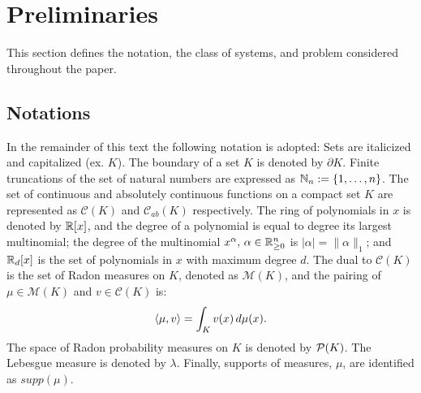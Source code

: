   \section{Preliminaries}
\label{sec:preliminaries}
  This section defines the notation, the class of systems, and problem considered throughout the paper.

  \subsection{Notations}
  In the remainder of this text the following notation is adopted:
Sets are italicized and capitalized (ex. $K$).
The boundary of a set $K$ is denoted by $\partial K$.
Finite truncations of the set of natural numbers are expressed as \mbox{$\mathbb{N}_n:=\{1,\ldots,n\}$}.
The set of continuous and absolutely continuous functions on a compact set $K$ are represented as $\mathcal C(K)$ and $\mathcal C_{ab}(K)$ respectively.
The ring of polynomials in $x$ is denoted by $\mathbb{R}[x]$, and the degree of a polynomial is equal to degree its largest multinomial; the degree of the multinomial $x^\alpha,\,\alpha\in \mathbb{R}_{\ge 0}^n$ is $|\alpha|=\|\alpha\|_1$; and $\mathbb{R}_d[x]$ is the set of polynomials in $x$ with maximum degree $d$.
The dual to $\mathcal C(K)$ is the set of Radon measures on $K$, denoted as $\mathcal M(K)$, and the pairing of $\mu\in \mathcal M(K)$ and $v\in \mathcal C(K)$ is:
  \begin{align}
  \left\langle \mu,v\right\rangle=\int_{K}v(x)\,d\mu(x).
  \end{align}
The space of Radon probability measures on $K$ is denoted by ${\cal P}(K)$.
The Lebesgue measure is denoted by $\lambda$.
Finally, supports of measures, $\mu$, are identified as $supp(\mu)$.

